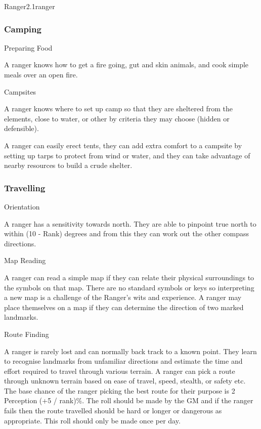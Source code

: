 \begin{skill}{Ranger}{2.1}{ranger}
\subsubsection{Camping}

\begin{Description}
\item[Preparing Food]

A ranger knows how to get a fire going, gut and skin animals, and cook
simple meals over an open fire.

\item[Campsites]

A ranger knows where to set up camp so that they are sheltered from
the elements, close to water, or other by criteria they may choose
(\eg hidden or defensible).

A ranger can easily erect tents, they can add extra comfort to a
campsite by setting up tarps to protect from wind or water, and they
can take advantage of nearby resources to build a crude shelter.
\end{Description}

\subsubsection{Travelling}

\begin{Description}

\item[Orientation]

A ranger has a sensitivity towards north. They are able to pinpoint
true north to within (10 - Rank) degrees and from this they can work
out the other compass directions.

\item[Map Reading]

A ranger can read a simple map if they can relate their physical
surroundings to the symbols on that map. There are no standard symbols
or keys so interpreting a new map is a challenge of the Ranger's
wits and experience. A ranger may place themselves on a map if they
can determine the direction of two marked landmarks.

\item[Route Finding]

A ranger is rarely lost and can normally back track to a known point.
They learn to recognise landmarks from unfamiliar directions and
estimate the time and effort required to travel through various
terrain.  A ranger can pick a route through unknown terrain based on
ease of travel, speed, stealth, or safety etc.  The base chance of the
ranger picking the best route for their purpose is 2 \x Perception (+5
/ rank)\%.  The roll should be made by the GM and if the ranger fails
then the route travelled should be hard or longer or dangerous as
appropriate.  This roll should only be made once per day.


\end{Description}
\end{skill}
